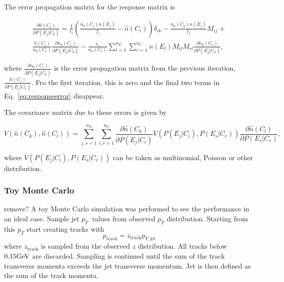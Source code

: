  The error propagation matrix for the response matrix is 
 
 \begin{multline}
 \frac{\partial \hat n\left(C_i\right)}{\partial P \left(E_j| C_k\right)} = \frac{1}{\epsilon_i}\left(\frac{n_0 \left(C_i\right) n\left(E_j\right)}{f_j} - \hat n \left(C_i\right) \right) \delta_{ik} - \frac{n_0 \left(C_k\right) n\left(E_j\right)}{f_j} M_{ij} + \\
  \frac{\hat n\left(C_i\right)}{n_0\left(C_i\right)} \frac{\partial n_0\left(C_i\right)}{\partial P \left(E_j| C_k\right)} - \frac{\epsilon_i}{n_0\left(C_i\right)} \sum_{l=1}^{n_E}\sum_{r=1}^{n_C} n\left(E_l\right) M_{il} M_{rl} \frac{\partial n_0 \left(C_r \right)}{\partial P \left(E_j| C_k\right)},
 \label{eq:responseerror}
 \end{multline}
 
 where $ \frac{\partial n_0\left(C_i\right)}{\partial P \left(E_j| C_k\right)}$ is the error propagation matrix from the previous iteration, $\frac{\hat n\left(C_i\right)}{\partial P \left(E_j| C_k\right)}$. Fro the first iteration, this is zero and the final two terms in Eq.~\ref{eq:responseerror} disappear.
 
 The covariance matrix due to these errors is given by
 
 \begin{equation}
 V\left(\hat n\left(C_k\right), \hat n\left(C_l\right)\right) = \sum_{j,s=1}^{n_E} \sum_{i,r=1}^{n_C} \frac{\partial \hat n\left(C_k\right) }{\partial P\left(E_j | C_i\right) }  V\left(P\left(E_j | C_i\right), P\left(E_s | C_r\right) \right)  \frac{\partial \hat n\left(C_l\right) }{\partial P\left(E_s | C_r\right) },
 \end{equation}
 
 where $V\left(P\left(E_j | C_i\right), P\left(E_s | C_r\right) \right)$ can be taken as multinomial, Poisson or other distribution.
 
\subsubsection{Toy Monte Carlo} 
 {\color{red} remove?}
 A toy Monte Carlo simulation was performed to see the performance in an ideal case.
Sample jet $p_T$ values from observed $p_T$ distribution. Starting from this $p_T$ start creating tracks with 
$$p_{\mathrm{track}} = z_\mathrm{track} p_{T,\mathrm{jet}}$$
where $z_\mathrm{track} $ is sampled from the observed $z$ distribution. All tracks below $0.15\mathrm{GeV}\kern-0.05em$ are discarded. Sampling is continued until the sum of the track transverse momenta exceeds the jet transverse momentum. Jet is then defined as the sum of the track momenta.

